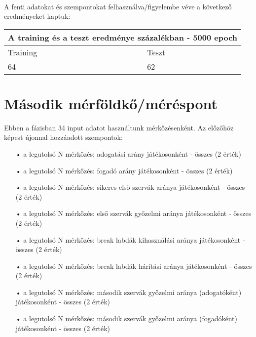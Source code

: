 \paragraph{}
A fenti adatokat és szempontokat felhasználva/figyelembe véve a következő eredményeket kaptuk: 
\begin{center}
\begin{tabular}{ |p{4cm}|p{4cm}|  }
 \hline
 \multicolumn{2}{|c|}{A training és a teszt eredménye százalékban - 5000 epoch} \\
 \hline
  Training & Teszt\\
 \hline
 64 & 62  \\
 \hline
\end{tabular}
\end{center}

\section{Második mérföldkő/méréspont}\label{sec:MAT:bev}
\paragraph{}
Ebben a fázisban 34 input adatot használtunk mérkőzésenként. Az előzőhöz képest újonnal hozzáadott szempontok:
\begin{enumerate}
\item[•] a legutolsó N mérkőzés: adogatási arány játékosonként - összes (2 érték)
\item[•] a legutolsó N mérkőzés: fogadó arány játékosonként - összes (2 érték)
\item[•] a legutolsó N mérkőzés: sikeres első szervák aránya játékosonként - összes (2 érték)
\item[•] a legutolsó N mérkőzés: első szervák győzelmi aránya játékosonként - összes (2 érték)
\item[•] a legutolsó N mérkőzés: break labdák kihasználási aránya játékosonként - összes (2 érték)
\item[•] a legutolsó N mérkőzés: break labdák hárítási aránya játékosonként - összes (2 érték)
\item[•] a legutolsó N mérkőzés: második szervák győzelmi aránya (adogatóként) játékosonként - összes (2 érték)
\item[•] a legutolsó N mérkőzés: második szervák győzelmi aránya (fogadóként) játékosonként - összes (2 érték)
\end{enumerate}

